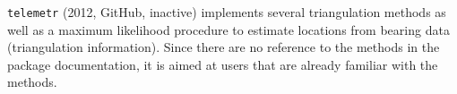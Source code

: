 \documentclass[a4paper,12pt]{article}
\newcommand{\Rpkg}[1]{\texttt{#1}}
\begin{document}
	\Rpkg{telemetr} (2012, GitHub, inactive) \citep{Rtelemetr} implements several triangulation methods as well as a maximum likelihood procedure to estimate locations from bearing data (triangulation information). Since there are no reference to the methods in the package documentation, it is aimed at users that are already familiar with the methods.
	
\end{document}

